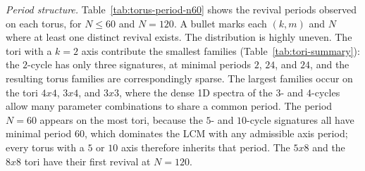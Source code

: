 \documentclass[aps,pra,reprint,amsmath,amssymb,superscriptaddress,floatfix]{revtex4-2}
\def\times{x}%
\begin{document}
\par
\emph{Period structure.}
Table~\ref{tab:torus-period-n60} shows the revival periods observed
on each torus, for $N \le 60$ and $N = 120$. A bullet marks each $(k, m)$ and $N$
where at least one distinct revival exists. The distribution is
highly uneven. The tori with a $k = 2$ axis contribute the smallest
families (Table~\ref{tab:tori-summary}): the $2$-cycle has only
three signatures, at minimal periods $2$, $24$, and $24$, and the
resulting torus families are correspondingly sparse. The largest
families occur on the tori $4 \times 4$, $3 \times 4$, and
$3 \times 3$, where the dense 1D spectra of the $3$- and $4$-cycles
allow many parameter combinations to share a common period. The
period $N = 60$ appears on the most tori, because the $5$- and
$10$-cycle signatures all have minimal period $60$, which dominates
the LCM with any admissible axis period; every torus with a $5$ or
$10$ axis therefore inherits that period.  The $5 \times 8$ and the
$8 \times 8$ tori have their first revival at $N = 120$. 
\par
\end{document}
